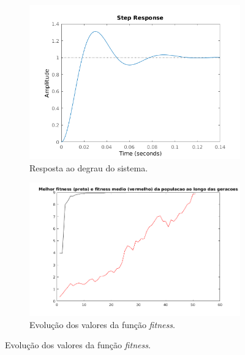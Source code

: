 \begin {enumerate}
    \FloatBarrier
			    
	\begin{figure}[h!]
	
	\centering
	
		\begin{subfigure}{.5\textwidth}
		  \centering
		  \includegraphics[width=1\linewidth]{image/step_pid_ex_d_5}
		  \caption{Resposta ao degrau do sistema.}
		  \label{fig:pid_step_d_5}
		\end{subfigure}%
		\begin{subfigure}{.5\textwidth}
		  \centering
		  \includegraphics[width=1\linewidth]{image/mutacao_pid_ex_d_5}
		  \caption{Evolução dos valores da função \textit{fitness}.}
		  \label{fig:pid_fitness_d_5}
		\end{subfigure}%
		

\end{figure}
\end{enumerate}
